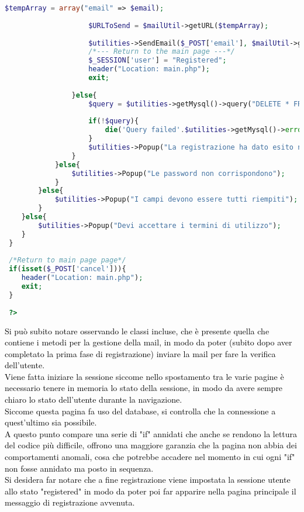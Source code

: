 \begin{lstlisting}[language=php]
 					$tempArray = array("email" => $email);
 					
 					$URLToSend = $mailUtil->getURL($tempArray);
 					
 					$utilities->SendEmail($_POST['email'], $mailUtil->getSubject(), $mailUtil->getBody($URLToSend), $mailUtil->getAlternativeBody($URLToSend));
 					/*--- Return to the main page ---*/
 					$_SESSION['user'] = "Registered";
 					header("Location: main.php");
 					exit;
 					
 				}else{
 					$query = $utilities->getMysql()->query("DELETE * FROM usert_table1 WHERE (email = '{$email}')");
 					
 					if(!$query){
 						die('Query failed'.$utilities->getMysql()->error);
 					} 
					$utilities->Popup("La registrazione ha dato esito negativo");
 				}
 			}else{
 				$utilities->Popup("Le password non corrispondono");
 			}
 		}else{
 			$utilities->Popup("I campi devono essere tutti riempiti");
 		}
 	}else{
 		$utilities->Popup("Devi accettare i termini di utilizzo");
 	}
 }
 
 /*Return to main page page*/
 if(isset($_POST['cancel'])){
 	header("Location: main.php");
 	exit;
 }
 
 ?>
 \end{lstlisting}
 
 \textcolor{black}{Si può subito notare osservando le classi incluse, che è presente quella che contiene i metodi per la gestione della mail, in modo da poter (subito dopo aver completato la prima fase di registrazione) inviare la mail per fare la verifica dell'utente.\\
 Viene fatta iniziare la sessione siccome nello spostamento tra le varie pagine è necessario tenere in memoria lo stato della sessione, in modo da avere sempre chiaro lo stato dell'utente durante la navigazione.\\
 Siccome questa pagina fa uso del database, si controlla che la connessione a quest'ultimo sia possibile.\\
 A questo punto compare una serie di "if" annidati che anche se rendono la lettura del codice più difficile, offrono una maggiore garanzia che la pagina non abbia dei comportamenti anomali, cosa che potrebbe accadere nel momento in cui ogni "if" non fosse annidato ma posto in sequenza.\\
 Si desidera far notare che a fine registrazione viene impostata la sessione utente allo stato "registered" in modo da poter poi far apparire nella pagina principale il messaggio di registrazione avvenuta.}\\
 
